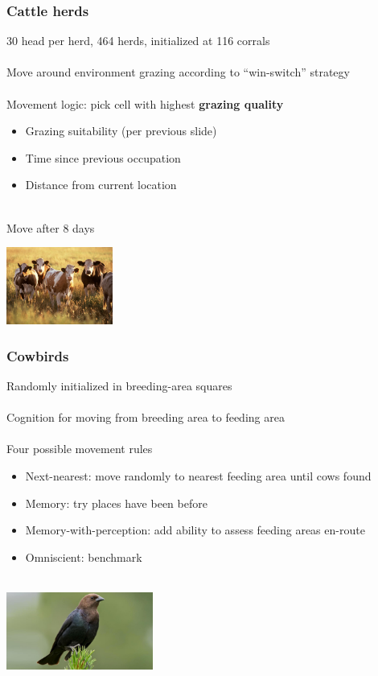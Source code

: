 \documentclass{beamer}
\begin{document}
\begin{frame}
	\frametitle{Cattle herds}

	30 head per herd, 464 herds, initialized at 116 corrals \\~\\

	Move around environment grazing according to ``win-switch'' strategy\\~\\

	Movement logic: pick cell with highest \textbf{grazing quality}
	\begin{itemize}
		\item \small Grazing suitability (per previous slide)
		\item \small Time since previous occupation
		\item \small Distance from current location \\~\\
	\end{itemize}

	Move after 8 days

	\begin{center}
		\includegraphics[height=1.0in, keepaspectratio]{herd.jpg}
	\end{center}
\end{frame}

\begin{frame}
	\frametitle{Cowbirds}

	Randomly initialized in breeding-area squares \\~\\

	Cognition for moving from breeding area to feeding area\\~\\

	Four possible movement rules 
	\begin{itemize}
		\item \small Next-nearest: move randomly to nearest feeding area until cows found
		\item \small Memory: try places have been before
		\item \small Memory-with-perception: add ability to assess feeding areas en-route
		\item \small Omniscient: benchmark\\~\\
	\end{itemize}
	\begin{center}
		\includegraphics[height=1.0in, keepaspectratio]{bird.jpg}
	\end{center}
\end{frame}
\end{document}
